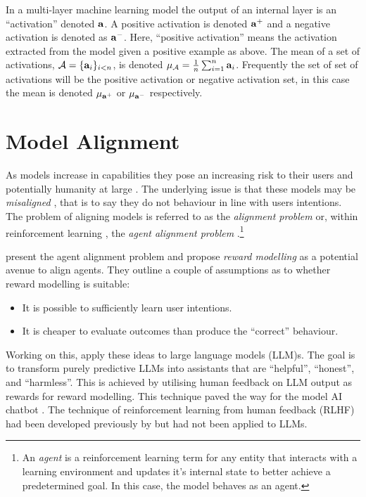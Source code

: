 In a multi-layer machine learning model the output of an internal layer is an ``activation'' denoted $\mathbf{a}$.
A positive activation is denoted $\mathbf{a}^+$ and a negative activation is denoted as $\mathbf{a}^-$. Here, ``positive activation'' means the activation extracted from the model given a positive example as above.
The mean of a set of activations, $\mathcal{A} = \{\mathbf{a}_i\}_{i < n}$, is denoted $\mu_\mathcal{A} = \frac{1}{n}\sum_{i=1}^{n}\mathbf{a}_i$.
Frequently the set of set of activations will be the positive activation or negative activation set, in this case the mean is denoted $\mu_{\mathbf{a}^+}$ or $\mu_{\mathbf{a}^-}$ respectively.

\section{Model Alignment}

As models increase in capabilities \citep{} they pose an increasing risk to their users \citep{c.ai, psychosis} and potentially humanity at large \citep{survellience, deepfakes, disempowerment}.
The underlying issue is that these models may be \emph{misaligned} \citep{agent-alignment}, that is to say they do not behaviour in line with users intentions.
The problem of aligning models is referred to as the \emph{alignment problem} or, within reinforcement learning \cite{rl}, the \emph{agent alignment problem} \citep{agent-alignment}.\footnote{An \emph{agent} is a reinforcement learning term for any entity that interacts with a learning environment and updates it's internal state to better achieve a predetermined goal. In this case, the model behaves as an agent.}

\citet{agent-alignment} present the agent alignment problem and propose \emph{reward modelling} as a potential avenue to align agents.
They outline a couple of assumptions as to whether reward modelling is suitable:
\begin{itemize}[nolistsep]
    \item It is possible to sufficiently learn user intentions.
    \item It is cheaper to evaluate outcomes than produce the ``correct'' behaviour.
\end{itemize}
Working on this, \citet{rlhf} apply these ideas to large language models (LLM)s.
The goal is to transform purely predictive LLMs into assistants that are ``helpful'', ``honest'', and ``harmless''.
This is achieved by utilising human feedback on LLM output as rewards for reward modelling.
This technique paved the way for the model AI chatbot \citep{chatgpt}.
The technique of reinforcement learning from human feedback (RLHF) had been developed previously by \citet{rlhf-orig} but had not been applied to LLMs.

